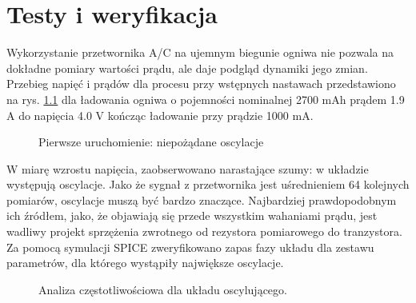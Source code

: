 \documentclass[polish,engineer]{polsl-msth}
\begin{document}
\chapter{Testy i weryfikacja}


Wykorzystanie przetwornika A/C na ujemnym biegunie ogniwa nie pozwala na dokładne pomiary wartości prądu, ale daje podgląd dynamiki jego zmian. Przebieg napięć i prądów dla procesu przy wstępnych nastawach przedstawiono na rys. \ref{img:1strun} dla ładowania ogniwa o pojemności nominalnej 2700 mAh prądem 1.9 A do napięcia 4.0 V kończąc ładowanie przy prądzie 1000 mA. 

\begin{figure}[hbtp]
     \caption{Pierwsze uruchomienie: niepożądane oscylacje \label{img:1strun}}
\end{figure}
W miarę wzrostu napięcia, zaobserwowano narastające szumy: w układzie występują oscylacje. Jako że sygnał z przetwornika jest uśrednieniem 64 kolejnych pomiarów, oscylacje muszą być bardzo znaczące.
Najbardziej prawdopodobnym ich źródłem, jako, że objawiają się przede wszystkim wahaniami prądu, jest wadliwy projekt sprzężenia zwrotnego od rezystora pomiarowego do tranzystora. Za pomocą symulacji SPICE zweryfikowano zapas fazy układu dla zestawu parametrów, dla którego wystąpiły największe oscylacje.
\begin{figure}[hbtp]
     \caption{Analiza częstotliwościowa dla układu oscylującego. \label{img:bode_nocap}}
\end{figure}
\end{document}
